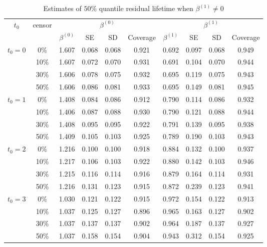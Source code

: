 \documentclass[12pt]{article}
\begin{document}
	\begin{table}[H]
		\caption{Estimates of $50\%$ quantile residual lifetime when $\beta^{(1)} \neq 0$}
		\centering
		\begin{tabular}{|c|c|c|c|c|c|c|c|c|c|}
			\hline
			\multirow{2}{*}{$t_0$} & \multirow{2}{*}{censor} & \multicolumn{4}{c|}{$\beta^{(0)}$} & \multicolumn{4}{c|}{$\beta^{(1)}$}\\ \cline{3-10}
			& & $\beta^{(0)}$ & SE & SD  & Coverage  & $\beta^{(1)}$ & SE & SD & Coverage\\
			\hline\hline
			\multirow{4}{*}{$t_0=0$} & 0\% & 1.607 & 0.068 & 0.068 & 0.921 & 0.692 & 0.097 & 0.068 & 0.949 \\
			& 10\% & 1.607 & 0.072 & 0.070 & 0.931 & 0.691 & 0.104 & 0.070 & 0.944 \\
			& 30\% & 1.606 & 0.078 & 0.075 & 0.932 & 0.695 & 0.119 & 0.075 & 0.943 \\
			& 50\% & 1.606 & 0.086 & 0.081 & 0.933 & 0.695 & 0.149 & 0.081 & 0.945 \\
			\hline
			\multirow{4}{*}{$t_0=1$} & 0\% & 1.408 & 0.084 & 0.086 & 0.912 & 0.790 & 0.114 & 0.086 & 0.932 \\
			& 10\% & 1.406 & 0.087 & 0.088 & 0.930 & 0.790 & 0.121 & 0.088 & 0.944 \\
			& 30\% & 1.408 & 0.095 & 0.095 & 0.922 & 0.791 & 0.139 & 0.095 & 0.938 \\
			& 50\% & 1.409 & 0.105 & 0.103 & 0.925 & 0.789 & 0.190 & 0.103 & 0.943 \\
			\hline
			\multirow{4}{*}{$t_0=2$} & 0\% & 1.216 & 0.100 & 0.100 & 0.918 & 0.884 & 0.132 & 0.100 & 0.937 \\
			& 10\% & 1.217 & 0.106 & 0.103 & 0.922 & 0.880 & 0.142 & 0.103 & 0.946 \\
			& 30\% & 1.215 & 0.116 & 0.114 & 0.916 & 0.879 & 0.164 & 0.114 & 0.931 \\
			& 50\% & 1.216 & 0.131 & 0.123 & 0.915 & 0.872 & 0.239 & 0.123 & 0.941 \\
			\hline
			\multirow{4}{*}{$t_0=3$} & 0\% & 1.030 & 0.121 & 0.122 & 0.915 & 0.972 & 0.154 & 0.122 & 0.913 \\
			& 10\% & 1.037 & 0.125 & 0.127 & 0.896 & 0.965 & 0.163 & 0.127 & 0.902 \\
			& 30\% & 1.037 & 0.137 & 0.137 & 0.902 & 0.964 & 0.187 & 0.137 & 0.927 \\
			& 50\% & 1.037 & 0.158 & 0.154 & 0.904 & 0.943 & 0.312 & 0.154 & 0.925 \\
			\hline
		\end{tabular}
	\end{table}
\end{document}
